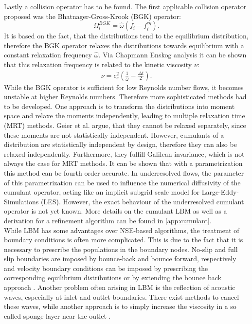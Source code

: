 Lastly a collision operator has to be found. The first applicable collision operator proposed was the Bhatnager-Gross-Krook (BGK) operator:
\begin{equation}
	\Omega^{BGK}_i = \hat{\omega}\left(f_i - f_i^{eq} \right). \label{eq:BGK}
\end{equation}
It is based on the fact, that the distributions tend to the equilibrium distribution, therefore the BGK operator relaxes the distributions towards equilibrium with a constant relaxation frequency $\hat{\omega}$. Via Chapmann Enskog analysis it can be shown that this relaxation frequency is related to the kinetic viscosity $\nu$: \cite[p. 98-100, 112]{kruger_lattice_2017}
\begin{align}
	\nu = c_s^2\left(\frac{1}{\hat{\omega}} - \frac{\Delta t }{2} \right). \label{eq:nu}
\end{align}
While the BGK operator is sufficient for low Reynolds number flows, it becomes unstable at higher Reynolds numbers. Therefore more sophisticated methods had to be developed. One approach is to transform the distributions into moment space and relaxe the moments independently, leading to multiple relaxation time (MRT) methods. Geier et al. argue, that they cannot be relaxed separately, since these moments are not statistically independent. However, cumulants of a distribution are statistically independent by design, therefore they can also be relaxed independently. Furthermore, they fulfill Galilean invariance, which is not always the case for MRT methods. It can be shown that with a parametrization this method can be fourth order accurate\cite{geier_fourth_2018}. In underresolved flows, the parameter of this parametrization can be used to influence the numerical diffusivity of the cumulant operator, acting like an implicit subgrid scale model for Large-Eddy-Simulations (LES)\cite{asmuth_actuator_2020}. However, the exact behaviour of the underresolved cumulant operator is not yet known. More details on the cumulant LBM as well as a derivation for a refinement algorithm can be found in \autoref{app:cumulant}. \\
While LBM has some advantages over NSE-based algorithms, the treatment of boundary conditions is often more complicated. This is due to the fact that it is necessary to prescribe the populations in the boundary nodes. No-slip and full slip boundaries are imposed by bounce-back and bounce forward, respectively and velocity boundary conditions can be imposed by prescribing the corresponding equilibrium distributions or by extending the bounce back approach \cite[p. 175 - 189, 199 - 207]{kruger_lattice_2017}. Another problem often arising in LBM is the reflection of acoustic waves, especially at inlet and outlet boundaries. There exist methods to cancel these waves, while another approach is to simply increase the viscosity in a so called sponge layer near the outlet \cite[p. 522 - 526]{kruger_lattice_2017}.